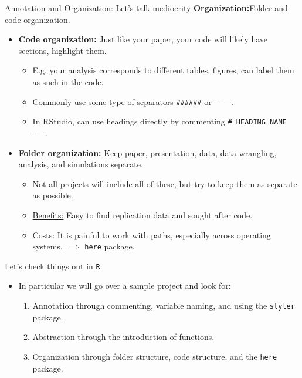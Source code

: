 \documentclass[aspectratio=169,xcolor=dvipsnames]{beamer}\usepackage[]{graphicx}\usepackage[]{color}
\begin{document}
\begin{frame}[t]{Annotation and Organization: Let's talk mediocrity}
  \textbf{Organization:}\pause Folder and code organization.\pause
  \begin{itemize}
    \item \textbf{Code organization:} Just like your paper, \alert{your code will likely have sections, highlight them}.\pause
    \begin{itemize}
      \item E.g. your analysis corresponds to different tables, figures, can label them as such in the code.\pause
      \item Commonly use some type of separators \texttt{\#\#\#\#\#\#} or \texttt{-----------}.\pause
      \item In RStudio, can use headings directly by commenting \texttt{\# HEADING NAME --------}.
    \end{itemize}
    \item \textbf{Folder organization:} Keep paper, presentation, data, data wrangling, analysis, and simulations separate.\pause
    \begin{itemize}
      \item Not all projects will include all of these, but try to keep them as separate as possible.\pause
      \item \underline{Benefits:} Easy to find replication data and sought after code.\pause
      \item \underline{Costs:} It is painful to work with paths, especially across operating systems. \pause $\implies$ \texttt{here} package.
    \end{itemize}
  \end{itemize}
\end{frame}


\begin{frame}[t]{Let's check things out in \texttt{R}}
  \begin{itemize}
    \item In particular we will go over a sample project and look for:\pause
    \begin{enumerate}
      \item Annotation through commenting, variable naming, and using the \texttt{styler} package.\pause\vspace{1em}
      \item Abstraction through the introduction of functions.\pause\vspace{1em}
      \item Organization through folder structure, code structure, and the \texttt{here} package.
    \end{enumerate}
  \end{itemize}
\end{frame}
\end{document}
